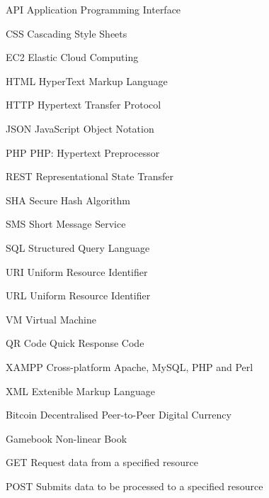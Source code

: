 \begin{Nomencl}[6em]
	\item[API] Application Programming Interface
	\item[CSS] Cascading Style Sheets
	\item[EC2]      Elastic Cloud Computing
	\item[HTML]		HyperText Markup Language
	\item[HTTP]     Hypertext Transfer Protocol
	\item[JSON]		JavaScript Object Notation
	\item[PHP]      PHP: Hypertext Preprocessor
	\item[REST]     Representational State Transfer 
	\item[SHA]		Secure Hash Algorithm
	\item[SMS]      Short Message Service
	\item[SQL]      Structured Query Language
	\item[URI] 		Uniform Resource Identifier
	\item[URL]		Uniform Resource Identifier
	\item[VM]		Virtual Machine
	\item[QR Code]	Quick Response Code
	\item[XAMPP]    Cross-platform Apache, MySQL, PHP and Perl
	\item[XML]      Extenible Markup Language

	\item[Bitcoin]	Decentralised Peer-to-Peer Digital Currency
	\item[Gamebook] Non-linear Book
	\item[GET]	Request data from a specified resource
	\item[POST] Submits data to be processed to a specified resource
\end{Nomencl}


\endinput
